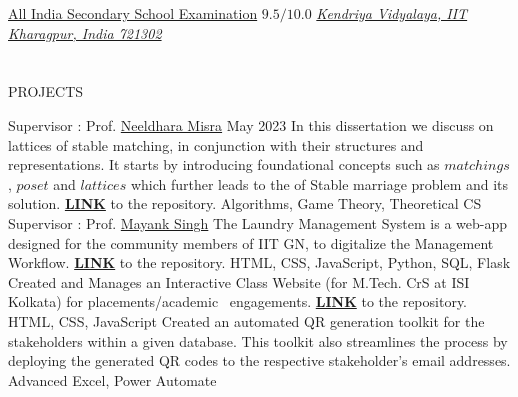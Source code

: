 \documentclass{my_cv}
\begin{document}
\begin{multicols}{2}
{\href{https://en.wikipedia.org/wiki/All_India_Secondary_School_Examination}{All India Secondary School Examination}   \hfill $\mathbf{9.5/10.0}$} 
{\textit{\textit{\href{https://iitkharagpur.kvs.ac.in/}{Kendriya Vidyalaya, IIT Kharagpur, India 721302}}}} %
{}

\vspace{-10pt}
\section{\faCode}{PROJECTS}

    {Supervisor : Prof. \href{https://www.neeldhara.com/}{Neeldhara Misra} \hfill May 2023}
    {In this dissertation we discuss on lattices of stable matching, in conjunction with their structures and representations. It starts by introducing foundational concepts such as $matchings$, $poset$ and $lattices$ which further leads to the of Stable marriage problem and its solution.
    \href{https://github.com/0r-gh0/Msc-Thesis}{\textbf{LINK}} to the repository.}
    {Algorithms, Game Theory, Theoretical CS}
\vspace{-5pt}
%
    {Supervisor : Prof. \href{https://mayank4490.github.io/}{Mayank Singh}}%
    {The Laundry Management System is a web-app designed for the community members of IIT GN, to digitalize the Management Workflow. \href{https://github.com/zealshah-05/Laundry-Management-System-IITGN}{\textbf{LINK}} to the repository.}
    {HTML, CSS, JavaScript, Python, SQL, Flask}
\vspace{-5pt}
    {}
    {Created and Manages an Interactive Class Website (for M.Tech. CrS at ISI 
 Kolkata) for placements/academic \ engagements. \href{https://github.com/cryptopaths/cryptopaths.github.io}{\textbf{LINK}} to the repository.}
    {HTML, CSS, JavaScript}
\vspace{-5pt}
    {}
    {Created an automated QR generation toolkit for the stakeholders within a given database. This toolkit also streamlines the process by deploying the generated QR codes to the respective stakeholder's email addresses.}
    {Advanced Excel, Power Automate}

\vspace{-4pt}


\end{multicols}
\end{document}
